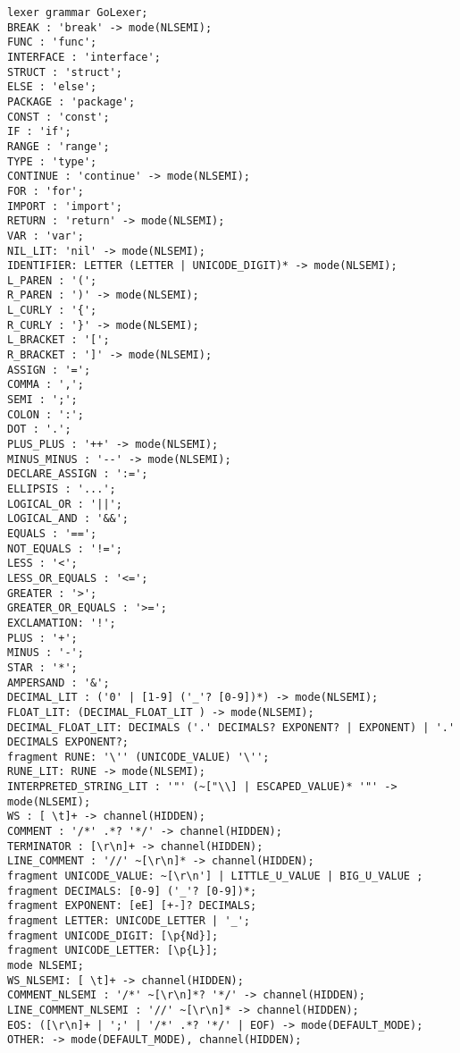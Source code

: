 \begin{lstlisting}[basicstyle=\scriptsize,caption={Описание лексического анализатора}]
lexer grammar GoLexer;
BREAK : 'break' -> mode(NLSEMI);
FUNC : 'func';
INTERFACE : 'interface';
STRUCT : 'struct';
ELSE : 'else';
PACKAGE : 'package';
CONST : 'const';
IF : 'if';
RANGE : 'range';
TYPE : 'type';
CONTINUE : 'continue' -> mode(NLSEMI);
FOR : 'for';
IMPORT : 'import';
RETURN : 'return' -> mode(NLSEMI);
VAR : 'var';
NIL_LIT: 'nil' -> mode(NLSEMI);
IDENTIFIER: LETTER (LETTER | UNICODE_DIGIT)* -> mode(NLSEMI);
L_PAREN : '(';
R_PAREN : ')' -> mode(NLSEMI);
L_CURLY : '{';
R_CURLY : '}' -> mode(NLSEMI);
L_BRACKET : '[';
R_BRACKET : ']' -> mode(NLSEMI);
ASSIGN : '=';
COMMA : ',';
SEMI : ';';
COLON : ':';
DOT : '.';
PLUS_PLUS : '++' -> mode(NLSEMI);
MINUS_MINUS : '--' -> mode(NLSEMI);
DECLARE_ASSIGN : ':=';
ELLIPSIS : '...';
LOGICAL_OR : '||';
LOGICAL_AND : '&&';
EQUALS : '==';
NOT_EQUALS : '!=';
LESS : '<';
LESS_OR_EQUALS : '<=';
GREATER : '>';
GREATER_OR_EQUALS : '>=';
EXCLAMATION: '!';
PLUS : '+';
MINUS : '-';
STAR : '*';
AMPERSAND : '&';
DECIMAL_LIT : ('0' | [1-9] ('_'? [0-9])*) -> mode(NLSEMI);
FLOAT_LIT: (DECIMAL_FLOAT_LIT ) -> mode(NLSEMI);
DECIMAL_FLOAT_LIT: DECIMALS ('.' DECIMALS? EXPONENT? | EXPONENT) | '.' DECIMALS EXPONENT?;
fragment RUNE: '\'' (UNICODE_VALUE) '\'';
RUNE_LIT: RUNE -> mode(NLSEMI);
INTERPRETED_STRING_LIT : '"' (~["\\] | ESCAPED_VALUE)* '"' -> mode(NLSEMI);
WS : [ \t]+ -> channel(HIDDEN);
COMMENT : '/*' .*? '*/' -> channel(HIDDEN);
TERMINATOR : [\r\n]+ -> channel(HIDDEN);
LINE_COMMENT : '//' ~[\r\n]* -> channel(HIDDEN);
fragment UNICODE_VALUE: ~[\r\n'] | LITTLE_U_VALUE | BIG_U_VALUE ;
fragment DECIMALS: [0-9] ('_'? [0-9])*;
fragment EXPONENT: [eE] [+-]? DECIMALS;
fragment LETTER: UNICODE_LETTER | '_';
fragment UNICODE_DIGIT: [\p{Nd}];
fragment UNICODE_LETTER: [\p{L}];
mode NLSEMI;
WS_NLSEMI: [ \t]+ -> channel(HIDDEN);
COMMENT_NLSEMI : '/*' ~[\r\n]*? '*/' -> channel(HIDDEN);
LINE_COMMENT_NLSEMI : '//' ~[\r\n]* -> channel(HIDDEN);
EOS: ([\r\n]+ | ';' | '/*' .*? '*/' | EOF) -> mode(DEFAULT_MODE);
OTHER: -> mode(DEFAULT_MODE), channel(HIDDEN);
\end{lstlisting}


